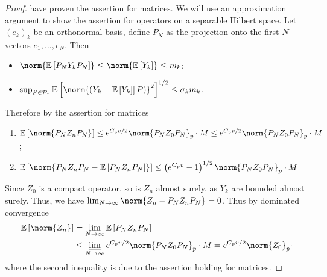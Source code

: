 \begin{proof}
  \cite{huang2020matrix} have proven the assertion for matrices. We will use an approximation argument to show the assertion for operators on a separable Hilbert space. Let \( (e_k)_k \) be an orthonormal basis, define \( P_N \) as the projection onto the first \( N \) vectors \( e_1,\dots, e_N \). Then
  \begin{itemize}
    \item \( \norm{\mathbb{E}\left[P_NY_kP_N\right]}_{} \leq \norm{\mathbb{E}\left[Y_k\right]}_{} \leq m_k\);
    \item \( \sup_{P\in \mathcal{P}_r} \mathbb{E}\left[ \norm{\left(Y_k-\mathbb{E}\left[Y_k]\right]P\right)}_{}^{2}\right]^{1/2} \leq \sigma_km_k \).
  \end{itemize}
  Therefore by the assertion for matrices
  \begin{enumerate}[1)]
    \item \( \mathbb{E}\left[ \norm{P_NZ_nP_N}_{}\right]  \leq e^{C_pv/2} \norm{P_NZ_0P_N}_{p} \cdot M \leq e^{C_pv/2} \norm{P_NZ_0P_N}_{p} \cdot M\);
    \item \( \mathbb{E}\left[\norm{P_NZ_nP_N-\mathbb{E}\left[P_NZ_nP_N\right]}_{}\right] \leq \left(e^{C_pv}-1\right)^{1/2} \norm{P_NZ_0P_N}_{p}\cdot M \)
  \end{enumerate}
  

  Since \( Z_0 \) is a compact operator, so is \( Z_n \) almost surely, as \( Y_k \) are bounded almost surely. Thus, we have \( \lim_{N \to \infty} \norm{Z_n- P_NZ_nP_N}_{}=0 \). Thus by dominated convergence 
  \begin{align*}
  \mathbb{E}\left[\norm{Z_n}_{}\right]&= \lim_{N \to \infty} \mathbb{E}\left[P_NZ_nP_N\right] \\
                                      & \leq \varliminf_{N \to \infty} e^{C_pv/2} \norm{P_NZ_0P_N}_{p} \cdot M = e^{C_pv/2}\norm{Z_0}_{p}\cdot 
  \end{align*}
where the second inequality is due to the assertion holding for matrices.
\end{proof}
